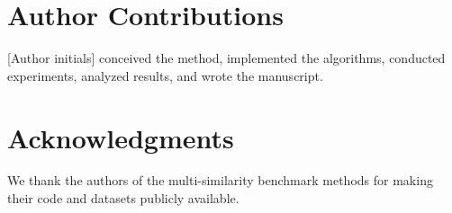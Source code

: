 \documentclass[webpdf,modern,large]{oup-authoring-template}
\begin{document}
\section*{Author Contributions}

[Author initials] conceived the method, implemented the algorithms, conducted experiments, analyzed results, and wrote the manuscript.

\section*{Acknowledgments}

We thank the authors of the multi-similarity benchmark methods \citep{yang2020msbmf,yang2019,yang2021hgimc} for making their code and datasets publicly available.



\end{document}

